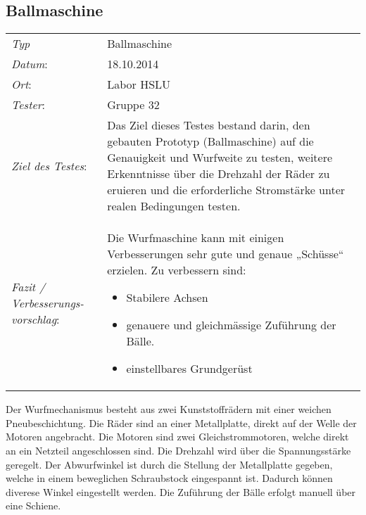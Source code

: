 ﻿\subsection{Ballmaschine}
\begin{tabular}{p{3.6cm}p{9.4cm}}
\rule{0pt}{11pt}\textit{Typ}              & Ballmaschine \\ 
\rule{0pt}{11pt}\textit{Datum}:           & 18.10.2014   \\
\rule{0pt}{11pt}\textit{Ort}:             & Labor HSLU \\
\rule{0pt}{11pt}\textit{Tester}:          & Gruppe 32 \\
\rule{0pt}{11pt}\textit{Ziel des Testes}: & Das Ziel dieses Testes bestand darin, den gebauten Prototyp (Ballmaschine) auf die Genauigkeit und Wurfweite zu testen, weitere Erkenntnisse über die Drehzahl der Räder zu eruieren und die erforderliche Stromstärke unter realen Bedingungen testen.  \\
\rule{0pt}{11pt}\textit{Fazit / Verbesserungs-\newline vorschlag}: & Die Wurfmaschine kann mit einigen Verbesserungen sehr gute und genaue „Schüsse“ erzielen. Zu verbessern sind:
\begin{itemize}
    \item Stabilere Achsen
    \item genauere und gleichmässige Zuführung der Bälle.
    \item einstellbares Grundgerüst
\end{itemize}\\
\end{tabular}

Der Wurfmechanismus besteht aus zwei Kunststoffrädern mit einer weichen Pneubeschichtung. Die Räder sind an einer Metallplatte, direkt auf der Welle der Motoren angebracht. Die Motoren sind zwei Gleichstrommotoren, welche direkt an ein Netzteil angeschlossen sind. Die Drehzahl wird über die Spannungsstärke geregelt. Der Abwurfwinkel ist durch die Stellung der Metallplatte gegeben, welche in einem beweglichen Schraubstock eingespannt ist. Dadurch können diverese Winkel eingestellt werden. Die Zuführung der Bälle erfolgt manuell über eine Schiene.
